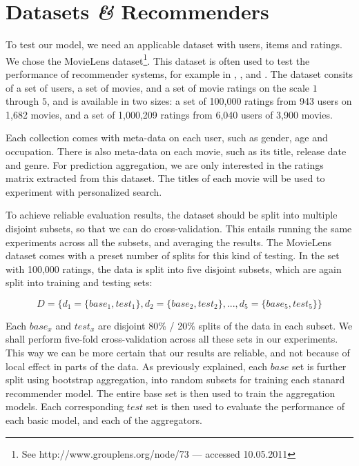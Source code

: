 \section{Datasets \emph{\&} Recommenders}

To test our model, we need an applicable dataset with users, items and ratings.
We chose the MovieLens dataset\footnote{
See http://www.grouplens.org/node/73 --- accessed 10.05.2011}.
This dataset is often used to test the performance of recommender systems,
for example in \citet[p9]{Alshamri2008}, \citet[p4]{Lemire2005}, \citet[p1]{Adomavicius2005}
and \citet[p2]{Herlocker2004}.
The dataset consits of a set of users, a set of movies, and a set of movie ratings
on the scale $1$ through $5$, and is available in two sizes:
a set of 100,000 ratings from 943 users on 1,682 movies,
and a set of 1,000,209 ratings from 6,040 users of 3,900 movies.

Each collection comes with meta-data on each user, such as
gender, age and occupation. There is also meta-data on each movie,
such as its title, release date and genre. 
For prediction aggregation, we are only interested in the ratings matrix
extracted from this dataset.
The titles of each movie will be used to experiment with personalized search.

To achieve reliable evaluation results, the dataset should be split into
multiple disjoint subsets, so that we can do cross-validation.
This entails running the same experiments across all the subsets,
and averaging the results.
The MovieLens dataset comes with a preset number of splits for this kind of testing.
In the set with 100,000 ratings, the data is split into five disjoint subsets,
which are again split into training and testing sets:

\begin{equation*}
  D = \{ d_1 = \{base_1, test_1\}, d_2 = \{base_2, test_2\}, ..., d_5 = \{base_5, test_5\} \}
\end{equation*}

Each $base_x$ and $test_x$ are disjoint 80\% / 20\% splits of the data in each subset.
We shall perform five-fold cross-validation across all these sets in our experiments.
This way we can be more certain that our results are reliable,
and not because of local effect in parts of the data.
As previously explained, each $base$ set is further split using bootstrap aggregation,
into random subsets for training each stanard recommender model.
The entire base set is then used to train the aggregation models.
Each corresponding $test$ set is then used to evaluate the performance
of each basic model, and each of the aggregators.

